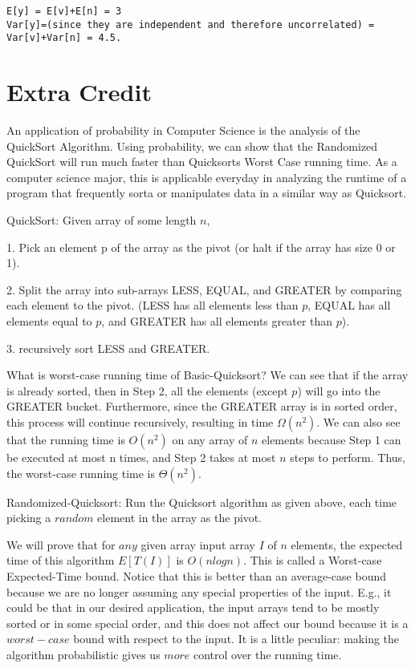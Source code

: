 \documentclass[12pt]{article}
\begin{document}
\begin{verbatim}
E[y] = E[v]+E[n] = 3
Var[y]=(since they are independent and therefore uncorrelated) = Var[v]+Var[n] = 4.5.
\end{verbatim}


 \pagebreak
    
        \section*{Extra Credit }   
An application of probability in Computer Science is the analysis of the QuickSort Algorithm.  Using probability, we can show that the Randomized QuickSort will run much faster than Quicksorts Worst Case running time.  As a computer science major, this is applicable everyday in analyzing the runtime of a program that frequently sorta or manipulates data in a similar way as Quicksort.

QuickSort:  Given array of some length $n$,

1. Pick an element p of the array as the pivot (or halt if the array has size 0 or 1).

2. Split the array into sub-arrays LESS, EQUAL, and GREATER by comparing each element to the pivot. (LESS has all elements less than $p$, EQUAL has all elements equal to $p$, and GREATER has all elements greater than $p$).
    
3. recursively sort LESS and GREATER.

 What is worst-case running time of Basic-Quicksort? We can see that if the array is already sorted, then in Step 2, all the elements (except $p$) will go into the GREATER bucket. Furthermore, since the GREATER array is in sorted order, this process will continue recursively, resulting in time $\Omega(n^2)$. We can also see that the running time is $O(n^2)$ on any array of $n$ elements because Step 1 can be executed at most n times, and Step 2 takes at most $n$ steps to perform. Thus, the worst-case running time is $\Theta(n^2)$.
 
 
  Randomized-Quicksort: Run the Quicksort algorithm as given above, each time picking a $random$ element in the array as the pivot.
  
We will prove that for $any$ given array input array $I$ of $n$ elements, the expected time of this algorithm $E[T(I)]$ is $O(nlogn)$. This is called a Worst-case Expected-Time bound. Notice that this is better than an average-case bound because we are no longer assuming any special properties of the input. E.g., it could be that in our desired application, the input arrays tend to be mostly sorted or in some special order, and this does not affect our bound because it is a $worst-case$ bound with respect to the input. It is a little peculiar: making the algorithm probabilistic gives us $more$ control over the running time.
  
\end{document}
